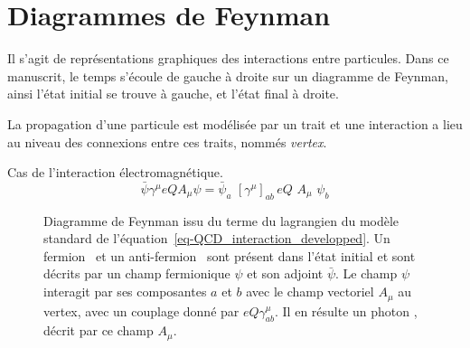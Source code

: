 \chapter{Diagrammes de Feynman}\label{annexe-fmf}

Il s'agit de représentations graphiques des interactions entre particules. Dans ce manuscrit, le temps s'écoule de gauche à droite sur un diagramme de Feynman, ainsi l'état initial se trouve à gauche, et l'état final à droite.

La propagation d'une particule est modélisée par un trait et une interaction a lieu au niveau des connexions entre ces traits, nommés \emph{vertex}.


Cas de l'interaction électromagnétique.
\begin{equation}
\bar{\psi}\gamma^\mu eQA_\mu \psi
=
\bar{\psi}_a \,\, [\gamma^\mu]_{ab} \, eQ \,\, A_\mu \,\, \psi_b
\label{eq-QCD_interaction_developped}
\end{equation}
\begin{figure}[h]
\centering
\vspace{\baselineskip}

\vspace{\baselineskip}
\caption{Diagramme de Feynman issu du terme du lagrangien du modèle standard de l'équation~\eqref{eq-QCD_interaction_developped}. Un fermion \fermion\ et un anti-fermion \antifermion\ sont présent dans l'état initial et sont décrits par un champ fermionique $\psi$ et son adjoint $\bar{\psi}$. Le champ $\psi$ interagit par ses composantes $a$ et $b$ avec le champ vectoriel $A_\mu$ au vertex, avec un couplage donné par $eQ\gamma^\mu_{ab}$. Il en résulte un photon \photon, décrit par ce champ $A_\mu$.}
\label{fig-fgraph-ff_Gamma1-large-annexeB}
\end{figure}